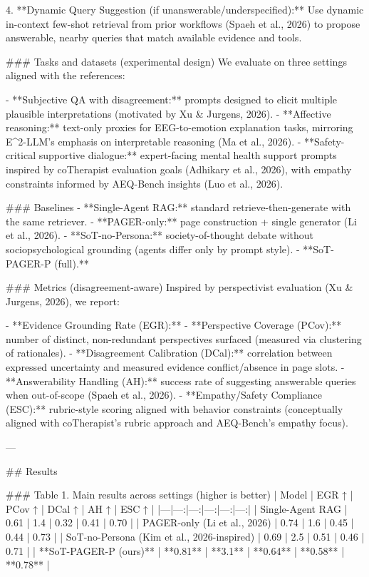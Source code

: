 4. **Dynamic Query Suggestion (if unanswerable/underspecified):**  
   Use dynamic in-context few-shot retrieval from prior workflows (Spaeh et al., 2026) to propose answerable, nearby queries that match available evidence and tools.

### Tasks and datasets (experimental design)  
We evaluate on three settings aligned with the references:

- **Subjective QA with disagreement:** prompts designed to elicit multiple plausible interpretations (motivated by Xu & Jurgens, 2026).  
- **Affective reasoning:** text-only proxies for EEG-to-emotion explanation tasks, mirroring E^2-LLM’s emphasis on interpretable reasoning (Ma et al., 2026).  
- **Safety-critical supportive dialogue:** expert-facing mental health support prompts inspired by coTherapist evaluation goals (Adhikary et al., 2026), with empathy constraints informed by AEQ-Bench insights (Luo et al., 2026).  

### Baselines  
- **Single-Agent RAG:** standard retrieve-then-generate with the same retriever.  
- **PAGER-only:** page construction + single generator (Li et al., 2026).  
- **SoT-no-Persona:** society-of-thought debate without sociopsychological grounding (agents differ only by prompt style).  
- **SoT-PAGER-P (full).**

### Metrics (disagreement-aware)  
Inspired by perspectivist evaluation (Xu & Jurgens, 2026), we report:

- **Evidence Grounding Rate (EGR):** %
- **Perspective Coverage (PCov):** number of distinct, non-redundant perspectives surfaced (measured via clustering of rationales).  
- **Disagreement Calibration (DCal):** correlation between expressed uncertainty and measured evidence conflict/absence in page slots.  
- **Answerability Handling (AH):** success rate of suggesting answerable queries when out-of-scope (Spaeh et al., 2026).  
- **Empathy/Safety Compliance (ESC):** rubric-style scoring aligned with behavior constraints (conceptually aligned with coTherapist’s rubric approach and AEQ-Bench’s empathy focus).

---

## Results  

### Table 1. Main results across settings (higher is better)  
| Model | EGR ↑ | PCov ↑ | DCal ↑ | AH ↑ | ESC ↑ |
|---|---:|---:|---:|---:|---:|
| Single-Agent RAG | 0.61 | 1.4 | 0.32 | 0.41 | 0.70 |
| PAGER-only (Li et al., 2026) | 0.74 | 1.6 | 0.45 | 0.44 | 0.73 |
| SoT-no-Persona (Kim et al., 2026-inspired) | 0.69 | 2.5 | 0.51 | 0.46 | 0.71 |
| **SoT-PAGER-P (ours)** | **0.81** | **3.1** | **0.64** | **0.58** | **0.78** |

